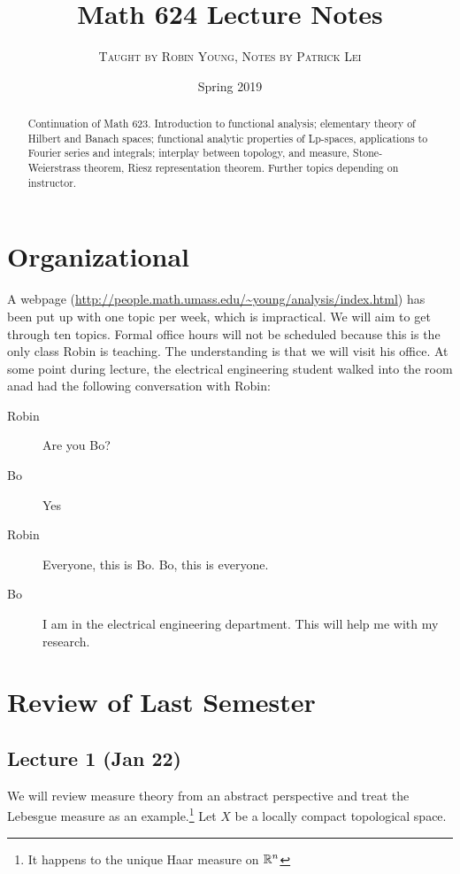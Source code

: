 \documentclass[10pt, twoside]{article}
\title{Math 624 Lecture Notes}
\author{\scshape Taught by Robin Young, Notes by Patrick Lei}
\affil{\itshape University of Massachusetts, Amherst}
\date{Spring 2019}
\begin{document}
    \maketitle\thispagestyle{firstpage}
    
    \begin{abstract}
        Continuation of Math 623. Introduction to functional analysis; elementary theory of Hilbert and Banach spaces; functional analytic properties of Lp-spaces, applications to Fourier series and integrals; interplay between topology, and measure, Stone-Weierstrass theorem, Riesz representation theorem. Further topics depending on instructor.
    \end{abstract}

    \tableofcontents

    \section{Organizational}
    A webpage (\url{http://people.math.umass.edu/~young/analysis/index.html}) has been put up with one topic per week, which is impractical. We will aim to get through ten topics. Formal office hours will not be scheduled because this is the only class Robin is teaching. The understanding is that we will visit his office. At some point during lecture, the electrical engineering student walked into the room anad had the following conversation with Robin:

    \begin{description}
        \item[Robin] Are you Bo?
        \item[Bo] Yes
        \item[Robin] Everyone, this is Bo. Bo, this is everyone.
        \item[Bo] I am in the electrical engineering department. This will help me with my research.   
    \end{description}

    \section{Review of Last Semester}

    \subsection{Lecture 1 (Jan 22)}
    We will review measure theory from an abstract perspective and treat the Lebesgue measure as an example.\footnote{It happens to the unique Haar measure on $\mathbb{R}^n$} Let $X$ be a locally compact topological space. 
    
\end{document}
